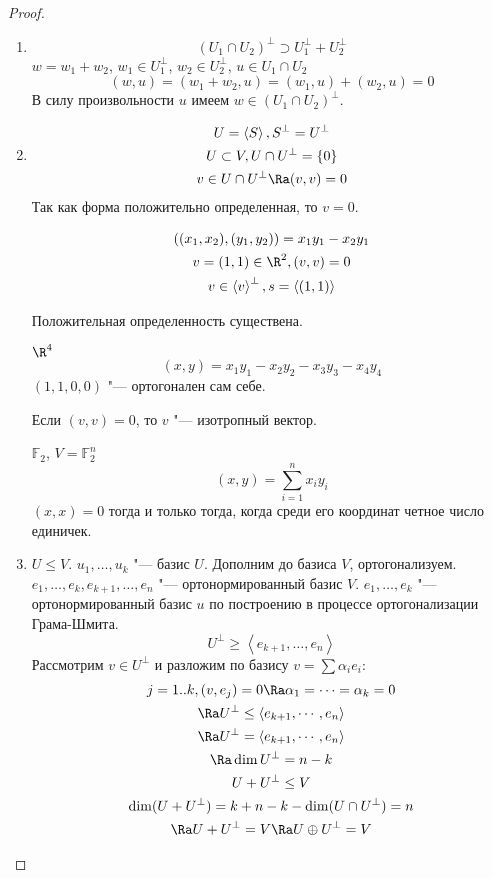 \begin{proof}
\begin{enumerate}
	\item
		\[ (U_1 \cap U_2)^\bot \supset U_1^\bot + U_2^\bot \]
		$w = w_1 + w_2$, $w_1 \in U_1^\bot$, $w_2 \in U_2^\bot$,
		$u \in U_1 \cap U_2$
		\[ (w, u) = (w_1 + w_2, u) = (w_1, u) + (w_2, u) = 0 \]
		В силу произвольности $u$ имеем $w \in (U_1 \cap U_2)^\bot$.

	\item
		\begin{gather*}
			U = \left<S\right>, S^\bot = U^\bot \\
			U \subset V, U \cap U^\bot = \{0\} \\
			v \in U \cap U^\bot \Ra (v, v) = 0
		\end{gather*}
		Так как форма положительно определенная, то $v = 0$.
		\begin{exmp}
			\begin{gather*}
				((x_1, x_2), (y_1, y_2)) = x_1 y_1 - x_2 y_1 \\
				v = (1, 1) \in \R^2 , (v, v) = 0 \\
				v \in \left<v\right>^\bot, s = \left<(1, 1)\right>
			\end{gather*}
			
			Положительная определенность существена. 
		\end{exmp}
		\begin{exmp}
			$\R^4$
			\[ (x, y) = x_1 y_1 - x_2 y_2 - x_3 y_3 - x_4 y_4 \]
			$(1, 1, 0, 0)$ "--- ортогонален сам себе.
		\end{exmp}
		\begin{Def}
			Если $(v, v) = 0$, то $v$ "--- изотропный вектор.
		\end{Def}
		\begin{exmp}
			$\mathbb{F}_2$, $V = \mathbb{F}_2^n$
			\[ (x, y) = \sum_{i = 1}^n  x_i y_i \]
			$(x, x) = 0$ тогда и только тогда, когда среди его координат четное число единичек.
		\end{exmp}

	\item
		$U \le V$.
		$u_1, \dots, u_k$ "--- базис $U$.
		Дополним до базиса $V$, ортогонализуем.
		$e_1, \dots, e_k, e_{k + 1}, \dots, e_n$ "--- ортонормированный базис $V$.
		$e_1, \dots, e_k$ "--- ортонормированный базис $u$ по построению в процессе ортогонализации Грама-Шмита.
		\[ U^\bot \ge \left<e_{k + 1}, \dots, e_n\right> \]
		Рассмотрим $v \in U^\bot$ и разложим по базису $v = \sum \alpha_i e_i$:
		\begin{gather*}
			j = 1..k, (v, e_j) = 0 \Ra \alpha_1 = \cdots = \alpha_k = 0 \\
			\Ra U^\bot \le \left<e_{k + 1}, \cdots, e_n\right> \\
			\Ra U^{\bot} = \left<e_{k + 1}, \cdots, e_n\right> \\
			\Ra \dim U^{\bot} = n - k\\
			U + U^\bot \le V \\
			\dim (U + U^\bot) = k + n - k - \dim (U \cap U^\bot) = n \\
			\Ra U + U^\bot = V \Ra U \oplus U^\bot = V
		\end{gather*}


\end{enumerate}
\end{proof}
